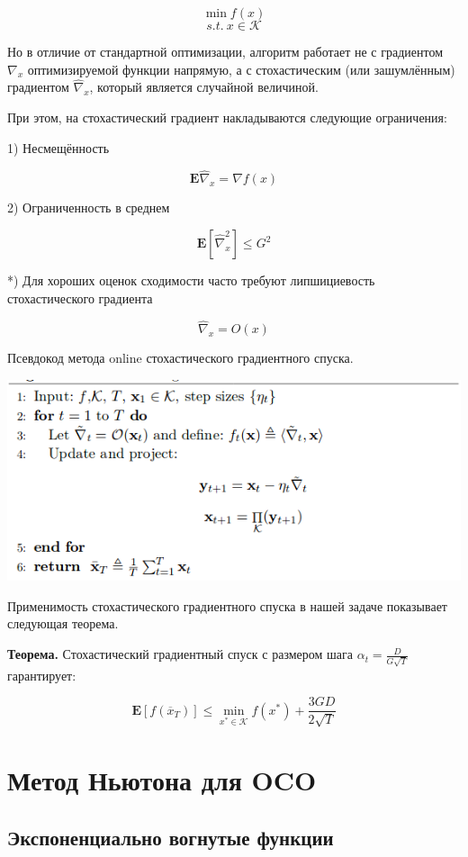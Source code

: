 \documentclass[12pt]{article}
\theoremstyle{definition}
\begin{document}
$$\min f(x)$$
$$s.t.\ x \in \mathcal{K}$$

Но в отличие от стандартной оптимизации, алгоритм работает не с градиентом $\nabla_x$ оптимизируемой функции напрямую, а с стохастическим (или зашумлённым) градиентом $\widehat{\nabla}_x$, который является случайной величиной.

При этом, на стохастический градиент накладываются следующие ограничения:
   
1) Несмещённость

   $$\textbf{E}\widehat{\nabla}_x = \nabla f(x)$$
   
2) Ограниченность в среднем

   $$\textbf{E}[\widehat{\nabla}_x^2] \leq G^2$$

*) Для хороших оценок сходимости часто требуют липшициевость стохастического градиента

   $$\widehat{\nabla}_x = O(x)$$

Псевдокод метода online стохастического градиентного спуска.

\includegraphics[width=\linewidth]{SGD_algo.png}

Применимость стохастического градиентного спуска в нашей задаче показывает следующая теорема.

\textbf{Теорема.} Стохастический градиентный спуск с размером шага $\alpha_t = \frac{D}{G\sqrt{T}}$ гарантирует:

$$\textbf{E}[f(\overline{x}_T)] \leq \min\limits_{x^* \in \mathcal{K}} f(x^*) + \frac{3GD}{2\sqrt{T}}$$

\section*{Метод Ньютона для OCO}

\subsection*{Экспоненциально вогнутые функции}
\end{document}
